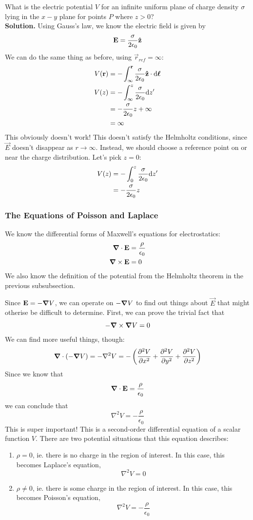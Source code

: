 \documentclass[a4paper]{article}
\begin{document}
\begin{eg}
	What is the electric potential $V$ for an infinite uniform plane of
	charge density $\sigma$ lying in the $x-y$ plane for points $P$ where
	$z > 0$?\\
	\textbf{Solution.}
	Using Gauss's law, we know the electric field is given by
	\[ \boldsymbol{\mathbf{E}} = \frac{\sigma}{2\epsilon_0}\boldsymbol{\mathbf{\hat{z}}} \]
	We can do the same thing as before, using $\vec{r}_{ref} = \infty$:
	\begin{align*}
		V(\boldsymbol{\mathbf{r}}) &= -\int_\infty^{\boldsymbol{\mathbf{r}}}\frac{\sigma}{2\epsilon_0}
		\boldsymbol{\mathbf{\hat{z}}}\cdot\mathrm{d}\boldsymbol{\mathbf{\ell}}\\
		V(z) &= -\int_\infty^{z}\frac{\sigma}{2\epsilon_0}\mathrm{d} z'\\
		     &= -\frac{\sigma}{2\epsilon_0}z + \infty\\
		     &= \infty
	\end{align*}
	This obviously doesn't work! This doesn't satisfy the Helmholtz
	conditions, since $\vec{E}$ doesn't disappear as $r\to\infty$.
	Instead, we should choose a reference point on or near the charge
	distribution. Let's pick $z=0$:
	\begin{align*}
		V(z) &= -\int_0^{z}\frac{\sigma}{2\epsilon_0}\mathrm{d} z'\\
		     &= -\frac{\sigma}{2\epsilon_0} z
	\end{align*}
\end{eg}

\subsubsection{The Equations of Poisson and Laplace}
We know the differential forms of Maxwell's equations for electrostatics:
\begin{align*}
	\boldsymbol{\mathbf{\nabla}}\cdot\boldsymbol{\mathbf{E}} &= \frac{\rho}{\epsilon_0}\\
	\boldsymbol{\mathbf{\nabla}}\times\boldsymbol{\mathbf{E}} &= 0
\end{align*}
We also know the definition of the potential from the Helmholtz theorem in the
previous subsubsection.

Since $\boldsymbol{\mathbf{E}}=-\boldsymbol{\mathbf{\nabla}} V$, we can operate on $-\boldsymbol{\mathbf{\nabla}} V$ to find out things about
$\vec{E}$ that might otherise be difficult to determine. First, we can
prove the trivial fact that
\[
	-\boldsymbol{\mathbf{\nabla}}\times\boldsymbol{\mathbf{\nabla}} V = 0
\]
We can find more useful things, though:
\begin{align*}
	\boldsymbol{\mathbf{\nabla}}\cdot(-\boldsymbol{\mathbf{\nabla}} V) = -\nabla^2 V=-\left(\frac{\partial ^2V}{\partial x^2} +
		\frac{\partial ^2V}{\partial y^2} + \frac{\partial ^2V}{\partial z^2}\right)
\end{align*}
Since we know that
\[ \boldsymbol{\mathbf{\nabla}}\cdot\boldsymbol{\mathbf{E}} = \frac{\rho}{\epsilon_0}\]
we can conclude that
\[\nabla^2V = -\frac{\rho}{\epsilon_0} \]
This is super important! This is a second-order differential equation of a
scalar function $V$. There are two potential situations that this equation
describes:
\begin{enumerate}
	\item $\rho = 0$, ie. there is no charge in the region of interest.
		In this case, this becomes Laplace's equation,
		\[ \nabla^2 V = 0 \]
	\item $\rho \neq 0$, ie. there is some charge in the region of
		interest. In this case, this becomes Poisson's equation,
		\[ \nabla^2 V = -\frac{\rho}{\epsilon_0} \]
\end{enumerate}
\end{document}
